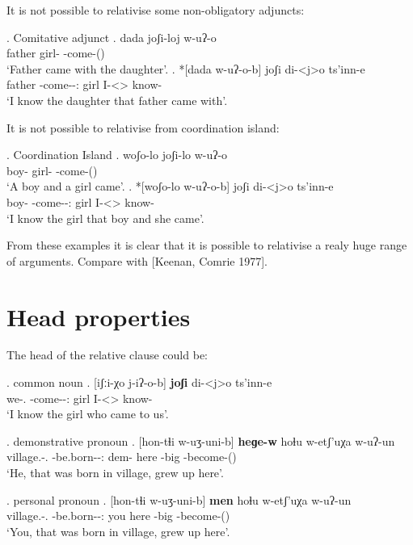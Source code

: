 It is not possible to relativise some non-obligatory adjuncts:

\ex. Comitative adjunct
	\ag. dada joʃi-loj w-uʔ-o\\
			father {girl-\Com} {\M-come-\Pst(\Aor)}\\
			\glt `Father came with the daughter'.	
	\bg. *[dada w-uʔ-o-b] joʃi di-<j>o ts'inn-e\\
			father {\M-come-\Pst-\Ptcp:\Pst} girl {I-<\F>\Aff} {know-\Hab}\\
			\glt `I know the daughter that father came with'.

It is not possible to relativise from coordination island:

\ex. Coordination Island
	\ag. woʃo-lo joʃi-lo w-uʔ-o\\
			{boy-\Addi} {girl-\Addi} {\M-come-\Pst(\Aor)}\\
			\glt `A boy and a girl came'.	
	\bg. *[woʃo-lo w-uʔ-o-b] joʃi di-<j>o ts'inn-e\\
			{boy-\Addi} {\M-come-\Pst-\Ptcp:\Pst} girl {I-<\F>\Aff} {know-\Hab}\\
			\glt `I know the girl that boy and she came'.

From these examples it is clear that it is possible to relativise a realy huge range of arguments. Compare with [Keenan, Comrie 1977].

\section{Head properties}
The head of the relative clause could be:

\ex. common noun
	\ag. [iʃːi-χo j-iʔ-o-b] \textbf{joʃi} di-<j>o ts'inn-e \\
		  {we-\Add.\Lat} {\F-come-\Pst-\Ptcp:\Pst} {girl} {I-<\F>\Aff} {know-\Hab}\\
		 \glt    `I know the girl who came to us'.

\ex. demonstrative pronoun
	\ag. [hon-tɬi w-uʒ-uni-b] \textbf{heɡe-w} hoɬu w-etʃ'uχa w-uʔ-un\\
			{village.\Obl-\Inter.\Ess} {\M-be.born-\Pst-\Ptcp:\Pst} {dem-\M} here {\M-big} {\M-become-\Pst(\Aor)}\\
			\glt `He, that was born in village, grew up here'.

\ex. personal pronoun
	\ag. [hon-tɬi w-uʒ-uni-b] \textbf{men} hoɬu w-etʃ'uχa w-uʔ-un\\
			{village.\Obl-\Inter.\Ess} {\M-be.born-\Pst-\Ptcp:\Pst} you here {\M-big} {\M-become-\Pst(\Aor)}\\
			\glt `You, that was born in village, grew up here'.
			
